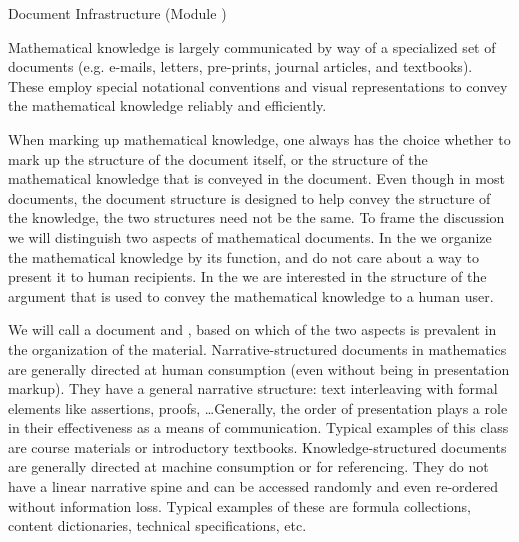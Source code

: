 
\begin{tchapter}[id=omdoc-infrastructure,short=Document Infrastructure]{Document Infrastructure (Module )}

Mathematical knowledge is largely communicated by way of a specialized set of
documents (e.g. e-mails, letters, pre-prints, journal articles, and textbooks).
These employ special notational conventions and visual
representations to convey the mathematical knowledge reliably and efficiently.

When marking up mathematical knowledge, one always has the choice whether to mark up the
structure of the document itself, or the structure of the mathematical knowledge that is
conveyed in the document. Even though in most documents, the document structure is
designed to help convey the structure of the knowledge, the two structures need not be the
same.  To frame the discussion we will distinguish two aspects of mathematical
documents. In the  we organize the mathematical
knowledge by its function, and do not care about a way to present it to human
recipients. In the  we are interested in the
structure of the argument that is used to convey the mathematical knowledge to a human
user.

We will call a document  and
, based on which of the
two aspects is prevalent in the organization of the material.  Narrative-structured
documents in mathematics are generally directed at human consumption (even without being
in presentation markup). They have a general narrative structure: text interleaving with
formal elements like assertions, proofs, \ldots Generally, the order of presentation plays
a role in their effectiveness as a means of communication.  Typical examples of this class
are course materials or introductory textbooks.  Knowledge-structured documents are
generally directed at machine consumption or for referencing. They do not have a linear
narrative spine and can be accessed randomly and even re-ordered without information loss.
Typical examples of these are formula collections, {\openmath} content dictionaries,
technical specifications, etc.


\end{tchapter}

